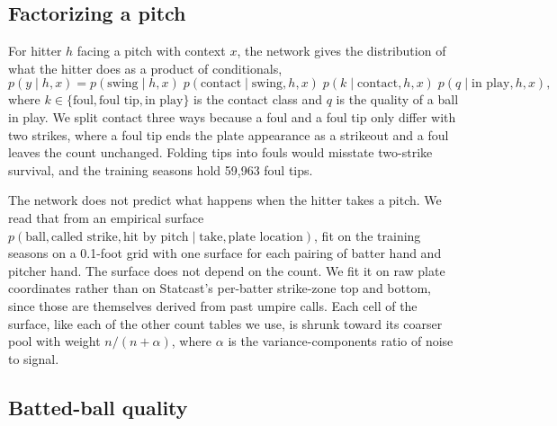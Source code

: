\documentclass[11pt,letterpaper]{article}
\begin{document}
\subsection{Factorizing a pitch}
\label{sec:factor}

For hitter $h$ facing a pitch with context $x$, the network gives the distribution of what the hitter does as a product of conditionals,
\begin{equation}
p(y \mid h, x) = p(\text{swing} \mid h, x)\; p(\text{contact} \mid \text{swing}, h, x)\; p(k \mid \text{contact}, h, x)\; p(q \mid \text{in play}, h, x),
\label{eq:factor}
\end{equation}
where $k \in \{\text{foul}, \text{foul tip}, \text{in play}\}$ is the contact class and $q$ is the quality of a ball in play. We split contact three ways because a foul and a foul tip only differ with two strikes, where a foul tip ends the plate appearance as a strikeout and a foul leaves the count unchanged. Folding tips into fouls would misstate two-strike survival, and the training seasons hold 59,963 foul tips.

The network does not predict what happens when the hitter takes a pitch. We read that from an empirical surface $p(\text{ball}, \text{called strike}, \text{hit by pitch} \mid \text{take}, \text{plate location})$, fit on the training seasons on a 0.1-foot grid with one surface for each pairing of batter hand and pitcher hand. The surface does not depend on the count. We fit it on raw plate coordinates rather than on Statcast's per-batter strike-zone top and bottom, since those are themselves derived from past umpire calls. Each cell of the surface, like each of the other count tables we use, is shrunk toward its coarser pool with weight $n/(n+\alpha)$, where $\alpha$ is the variance-components ratio of noise to signal.

\subsection{Batted-ball quality}
\label{sec:quality}
\end{document}
